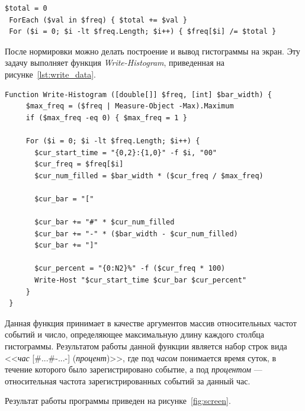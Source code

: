 \begin{lstlisting}[caption=Нормировка данных о числе событий,label=lst:enumerate_data]
 $total = 0
 ForEach ($val in $freq) { $total += $val }
 For ($i = 0; $i -lt $freq.Length; $i++) { $freq[$i] /= $total }
\end{lstlisting}

После нормировки можно делать построение и вывод гистограммы на экран.
Эту задачу выполняет функция \textit{Write-Histogram}, 
приведенная на рисунке~\ref{lst:write_data}.

\begin{lstlisting}[caption=Функция построения гистограммы \textit{Write-Histogram},label=lst:write_data]
 Function Write-Histogram ([double[]] $freq, [int] $bar_width) {
     $max_freq = ($freq | Measure-Object -Max).Maximum
     if ($max_freq -eq 0) { $max_freq = 1 } 
 
     For ($i = 0; $i -lt $freq.Length; $i++) {
       $cur_start_time = "{0,2}:{1,0}" -f $i, "00"
       $cur_freq = $freq[$i]
       $cur_num_filled = $bar_width * ($cur_freq / $max_freq)
       
       $cur_bar = "["
       
       $cur_bar += "#" * $cur_num_filled
       $cur_bar += "-" * ($bar_width - $cur_num_filled)
       $cur_bar += "]"
       
       $cur_percent = "{0:N2}%" -f ($cur_freq * 100)
       Write-Host "$cur_start_time $cur_bar $cur_percent"
     }
 }
\end{lstlisting}

Данная функция принимает в качестве аргументов массив относительных 
частот событий и число, определяющее максимальную длину каждого столбца
гистограммы. Результатом работы данной функции является набор строк вида 
<<\textit{час} [\#...\#-...-] (\textit{процент})>>,
где под \textit{часом} понимается время суток,
в течение которого было зарегистрировано событие,
а под \textit{процентом} --- относительная
частота зарегистрированных событий за данный час. 

Результат работы программы приведен на рисунке~\ref{fig:screen}.

